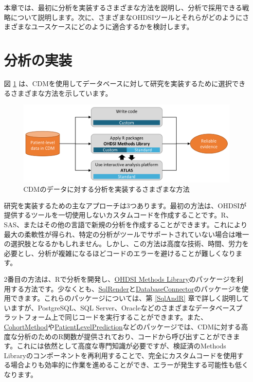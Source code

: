 \documentclass[
  11pt]{book}
\theoremstyle{definition}
\theoremstyle{definition}
\theoremstyle{definition}
\theoremstyle{definition}
\theoremstyle{remark}
\begin{document}
本章では、最初に分析を実装するさまざまな方法を説明し、分析で採用できる戦略について説明します。次に、さまざまなOHDSIツールとそれらがどのようにさまざまなユースケースにどのように適合するかを検討します。

\section{分析の実装}\label{analysisImplementation}

図 \ref{fig:implementations} は、CDMを使用してデータベースに対して研究を実装するために選択できるさまざまな方法を示しています。 

\begin{figure}

{\centering \includegraphics[width=0.9\linewidth]{images/OhdsiAnalyticsTools/implementations} 

}

\caption{CDMのデータに対する分析を実装するさまざまな方法}\label{fig:implementations}
\end{figure}

研究を実装するための主なアプローチは3つあります。最初の方法は、OHDSIが提供するツールを一切使用しないカスタムコードを作成することです。R、SAS、またはその他の言語で新規の分析を作成することができます。これにより最大の柔軟性が得られ、特定の分析がツールでサポートされていない場合は唯一の選択肢となるかもしれません。しかし、この方法は高度な技術、時間、労力を必要とし、分析が複雑になるほどコードのエラーを避けることが難しくなります。

2番目の方法は、Rで分析を開発し、\href{https://ohdsi.github.io/MethodsLibrary/}{OHDSI Methods Library}のパッケージを利用する方法です。少なくとも、\href{https://ohdsi.github.io/SqlRender/}{SqlRender}と\href{https://ohdsi.github.io/DatabaseConnector/}{DatabaseConnector}のパッケージを使用できます。これらのパッケージについては、第 \ref{SqlAndR} 章で詳しく説明していますが、PostgreSQL、SQL Server、Oracleなどのさまざまなデータベースプラットフォーム上で同じコードを実行することができます。また、\href{https://ohdsi.github.io/CohortMethod/}{CohortMethod}や\href{https://ohdsi.github.io/PatientLevelPrediction/}{PatientLevelPrediction}などのパッケージでは、CDMに対する高度な分析のためのR関数が提供されており、コードから呼び出すことができます。これには依然として高度な専門知識が必要ですが、検証済のMethods Libraryのコンポーネントを再利用することで、完全にカスタムコードを使用する場合よりも効率的に作業を進めることができ、エラーが発生する可能性も低くなります。
\end{document}
